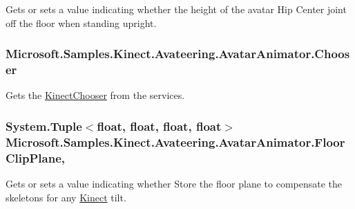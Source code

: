 Gets or sets a value indicating whether the height of the avatar Hip Center joint off the floor when standing upright. 

\hypertarget{class_microsoft_1_1_samples_1_1_kinect_1_1_avateering_1_1_avatar_animator_a80c63506559b26d0850796c9563fd449}{
\subsubsection[{Chooser}]{ Microsoft.\+Samples.\+Kinect.\+Avateering.\+Avatar\+Animator.\+Chooser\hspace{0.3cm}{\ttfamily [get]}}}\label{class_microsoft_1_1_samples_1_1_kinect_1_1_avateering_1_1_avatar_animator_a80c63506559b26d0850796c9563fd449}


Gets the \hyperlink{class_microsoft_1_1_samples_1_1_kinect_1_1_avateering_1_1_kinect_chooser}{Kinect\+Chooser} from the services. 

\hypertarget{class_microsoft_1_1_samples_1_1_kinect_1_1_avateering_1_1_avatar_animator_a3f5a9221dc2119e038dca80bae049d8a}{
\subsubsection[{Floor\+Clip\+Plane}]{\setlength{\rightskip}{0pt plus 5cm}System.\+Tuple$<$float, float, float, float$>$ Microsoft.\+Samples.\+Kinect.\+Avateering.\+Avatar\+Animator.\+Floor\+Clip\+Plane\hspace{0.3cm}{\ttfamily [get]}, {\ttfamily [set]}}}\label{class_microsoft_1_1_samples_1_1_kinect_1_1_avateering_1_1_avatar_animator_a3f5a9221dc2119e038dca80bae049d8a}


Gets or sets a value indicating whether Store the floor plane to compensate the skeletons for any \hyperlink{namespace_microsoft_1_1_samples_1_1_kinect}{Kinect} tilt. 

